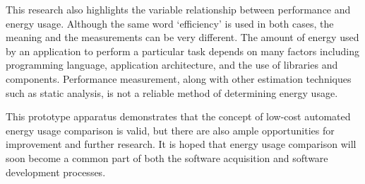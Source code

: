 This research also highlights the variable relationship between performance and energy usage. Although the same word `efficiency' is used in both cases, the meaning and the measurements can be very different. The amount of energy used by an application to perform a particular task depends on many factors including programming language, application architecture, and the use of libraries and components. Performance measurement, along with other estimation techniques such as static analysis, is not a reliable method of determining energy usage.

This prototype apparatus demonstrates that the concept of low-cost automated energy usage comparison is valid, but there are also ample opportunities for improvement and further research. It is hoped that energy usage comparison will soon become a common part of both the software acquisition and software development processes.
